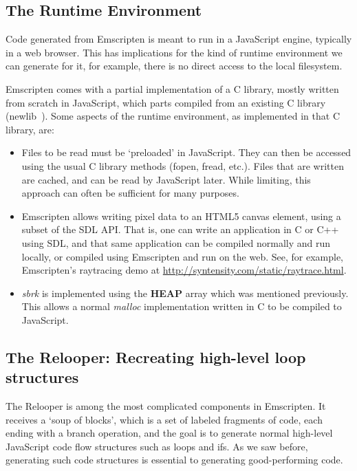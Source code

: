 \documentclass[11pt]{proc}
\begin{document}
\subsection{The Runtime Environment}

Code generated from Emscripten is meant to run in a JavaScript engine,
typically in a web browser. This has implications for the kind of
runtime environment we can generate for it, for example, there is no
direct access to the local filesystem.

Emscripten comes with a partial implementation of a C library,
mostly written from scratch in JavaScript, which parts compiled from an
existing C library (newlib~\cite{newlib}). Some aspects of the runtime environment, as
implemented in that C library, are:
\begin{itemize}
\item Files to be read must be `preloaded' in JavaScript. They can
      then be accessed using the usual C library methods (fopen, fread, etc.).
      Files that are written are cached, and can be read by JavaScript
      later. While limiting, this approach can often be sufficient for
      many purposes.
\item Emscripten allows writing pixel data to an HTML5 canvas element,
      using a subset of the SDL API. That is, one can write an application in C or C++ using
      SDL, and that same application can be compiled normally and run
      locally, or compiled using Emscripten and run on the web. See, for
      example, Emscripten's raytracing demo at \url{http://syntensity.com/static/raytrace.html}.
\item \emph{sbrk} is implemented using the \textbf{HEAP} array which
      was mentioned previously. This allows a normal \emph{malloc}
      implementation written in C to be compiled to JavaScript.
\end{itemize}

\subsection{The Relooper: Recreating high-level loop structures}
\label{sec:relooper}

The Relooper is among the most complicated components in Emscripten. It receives
a `soup of blocks', which is a set of labeled fragments of code, each
ending with a branch operation, and the goal is to generate normal
high-level JavaScript code flow structures such as loops and ifs. As
we saw before, generating such code structures is essential to generating good-performing code.
\end{document}
